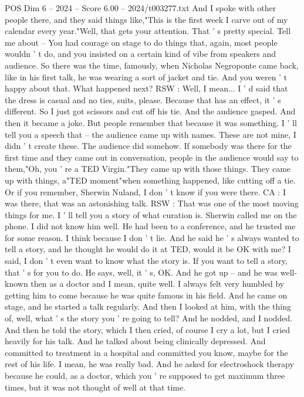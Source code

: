 \begin{textsample}{POS Dim 6 – 2024 – Score 6.00 – 2024/t003277.txt}
And I spoke with other people there, and they said things like,"This is the first week I carve out of my calendar every year."Well, that gets your attention.
That ' s pretty special.
Tell me about -- You had courage on stage to do things that, again, most people wouldn ' t do, and you insisted on a certain kind of vibe from speakers and audience.
So there was the time, famously, when Nicholas Negroponte came back, like in his first talk, he was wearing a sort of jacket and tie.
And you weren ' t happy about that.
What happened next?
RSW : Well, I mean...
I ' d said that the dress is casual and no ties, suits, please.
Because that has an effect, it ' s different.
So I just got scissors and cut off his tie.
And the audience gasped.
And then it became a joke.
But people remember that because it was something.
I ' ll tell you a speech that -- the audience came up with names.
These are not mine, I didn ' t create these.
The audience did somehow.
If somebody was there for the first time and they came out in conversation, people in the audience would say to them,"Oh, you ' re a TED Virgin."They came up with those things.
They came up with things, a"TED moment"when something happened, like cutting off a tie.
Or if you remember, Sherwin Nuland, I don ' t know if you were there.
CA : I was there, that was an astonishing talk.
RSW : That was one of the most moving things for me.
I ' ll tell you a story of what curation is.
Sherwin called me on the phone.
I did not know him well.
He had been to a conference, and he trusted me for some reason.
I think because I don ' t lie.
And he said he ' s always wanted to tell a story, and he thought he would do it at TED, would it be OK with me?
I said, I don ' t even want to know what the story is.
If you want to tell a story, that ' s for you to do.
He says, well, it ' s, OK.
And he got up -- and he was well-known then as a doctor and I mean, quite well.
I always felt very humbled by getting him to come because he was quite famous in his field.
And he came on stage, and he started a talk regularly.
And then I looked at him, with the thing of, well, what ' s the story you ' re going to tell?
And he nodded, and I nodded.
And then he told the story, which I then cried, of course I cry a lot, but I cried heavily for his talk.
And he talked about being clinically depressed.
And committed to treatment in a hospital and committed you know, maybe for the rest of his life.
I mean, he was really bad.
And he asked for electroshock therapy because he could, as a doctor, which you ' re supposed to get maximum three times, but it was not thought of well at that time.

\end{textsample}
